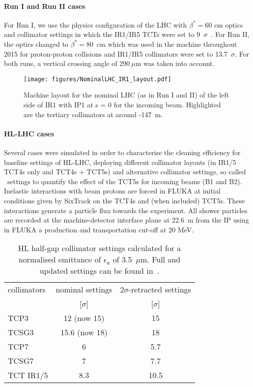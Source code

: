\paragraph{Run I and Run II cases}
For Run I, we use the physics configuration of the LHC with $\beta^* = 60$ cm optics and collimator settings in which the IR1/IR5 TCTs were set to 9~$\sigma$~\cite{parametersRun1}. For Run II, the optics changed to $\beta^* = 80$~cm which was used in the machine throughout 2015 for proton-proton collisions and IR1/IR5 collimators were set to 13.7~$\sigma$. For both runs, a vertical crossing angle of $290~\mu$m was taken into account.

\begin{figure}[!htb]
\begin{center}
\texttt{[image: figures/NominalLHC\_IR1\_layout.pdf]}
\end{center}
\vspace{-0.6cm}
 \caption{Machine layout for the nominal LHC (as in Run I and II) of the left side of IR1 with IP1 at s = 0 for the incoming beam. Highlighted are the tertiary collimators at around -147~m.
  \label{nominalLHC_layout}}
\end{figure}


\paragraph{HL-LHC cases}
Several cases were simulated in order to characterise the cleaning efficiency for baseline settings of HL-LHC, deploying different collimator layouts (in IR1/5 TCT4s only and TCT4s + TCT5s) and alternative collimator settings, so called \twosigmaret~settings to quantify the effect of the TCT5s for incoming beams (B1 and B2). Inelastic interactions with beam protons are forced in FLUKA at initial conditions given by SixTrack on the TCT4s and (when included) TCT5s. These interactions generate a particle flux towards the experiment. All shower particles are recorded at the machine-detector interface plane at 22.6~m from the IP using in FLUKA a production and transportation cut-off at 20 MeV.

\begin{table}%
   \centering
   \caption{HL half-gap collimator settings calculated for a normalised emittance of $\epsilon_{\mathrm{n}}$ of 3.5~$\mu$m. Full and updated settings can be found in~\cite{collSettRef}.}

   \begin{tabular}{l|c|c}
       \hline
       collimators &        nominal settings & $2\sigma$-retracted settings\\
                   &         [$\sigma$] &  [$\sigma$]\\
       \hline
       TCP3 & 12 (now 15) & 15 \\
       TCSG3 & 15.6 (now 18)& 18 \\
       TCP7 & 6 & 5.7 \\
       TCSG7 & 7 & 7.7 \\
       TCT IR1/5 & 8.3 & 10.5 \\
       \hline
   \end{tabular}
   \label{collSettings}
\end{table}


